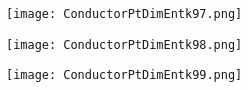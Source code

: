 \documentclass[pdf]{beamer}
\begin{document}
\begin{frame}
\begin{figure}[!h]
\centering
\texttt{[image: ConductorPtDimEntk97.png]}
\end{figure}
\end{frame}

\begin{frame}
\begin{figure}[!h]
\centering
\texttt{[image: ConductorPtDimEntk98.png]}
\end{figure}
\end{frame}

\begin{frame}
\begin{figure}[!h]
\centering
\texttt{[image: ConductorPtDimEntk99.png]}
\end{figure}
\end{frame}
\end{document}
